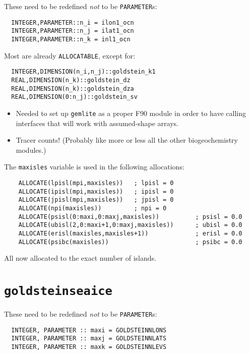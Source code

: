 \documentclass[a4paper,10pt,article]{memoir}
\begin{document}
These need to be redefined \emph{not} to be \texttt{PARAMETER}s:

\begin{verbatim}
  INTEGER,PARAMETER::n_i = ilon1_ocn
  INTEGER,PARAMETER::n_j = ilat1_ocn
  INTEGER,PARAMETER::n_k = inl1_ocn
\end{verbatim}

Most are already \texttt{ALLOCATABLE}, except for:

\begin{verbatim}
  INTEGER,DIMENSION(n_i,n_j)::goldstein_k1
  REAL,DIMENSION(n_k)::goldstein_dz
  REAL,DIMENSION(n_k)::goldstein_dza
  REAL,DIMENSION(0:n_j)::goldstein_sv
\end{verbatim}

\begin{itemize}
  \item{Needed to set up \texttt{gemlite} as a proper F90 module in
    order to have calling interfaces that will work with assumed-shape
    arrays.}
  \item{Tracer counts!  (Probably like more or less all the other
    biogeochemistry modules.)}
\end{itemize}

The \texttt{maxisles} variable is used in the following allocations:

\begin{verbatim}
    ALLOCATE(lpisl(mpi,maxisles))   ; lpisl = 0
    ALLOCATE(ipisl(mpi,maxisles))   ; ipisl = 0
    ALLOCATE(jpisl(mpi,maxisles))   ; jpisl = 0
    ALLOCATE(npi(maxisles))         ; npi = 0
    ALLOCATE(psisl(0:maxi,0:maxj,maxisles))          ; psisl = 0.0
    ALLOCATE(ubisl(2,0:maxi+1,0:maxj,maxisles))      ; ubisl = 0.0
    ALLOCATE(erisl(maxisles,maxisles+1))             ; erisl = 0.0
    ALLOCATE(psibc(maxisles))                        ; psibc = 0.0
\end{verbatim}

All now allocated to the exact number of islands.

\section{\texttt{goldsteinseaice}}

These need to be redefined \emph{not} to be \texttt{PARAMETER}s:

\begin{verbatim}
  INTEGER, PARAMETER :: maxi = GOLDSTEINNLONS
  INTEGER, PARAMETER :: maxj = GOLDSTEINNLATS
  INTEGER, PARAMETER :: maxk = GOLDSTEINNLEVS
\end{verbatim}
\end{document}
